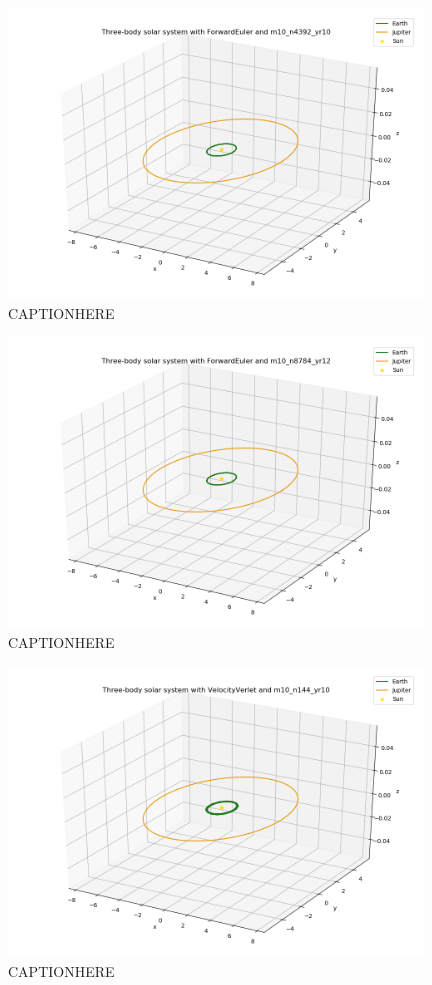 \documentclass{article}
\begin{document}
    \begin{figure}[H]
        \centering
        \includegraphics[width = 11cm]{img/plot3D_S_E_J_F_m10_n4392_yr10.png}
        \caption{CAPTIONHERE}
        \label{fig:plot3D_S_E_J_F_m10_n4392_yr10}
    \end{figure}

    \begin{figure}[H]
        \centering
        \includegraphics[width = 11cm]{img/plot3D_S_E_J_F_m10_n8784_yr12.png}
        \caption{CAPTIONHERE}
        \label{fig:plot3D_S_E_J_F_m10_n8784_yr12}
    \end{figure}

    \begin{figure}[H]
        \centering
        \includegraphics[width = 11cm]{img/plot3D_S_E_J_V_m10_n144_yr10.png}
        \caption{CAPTIONHERE}
        \label{fig:plot3D_S_E_J_V_m10_n144_yr10}
    \end{figure}
\end{document}
